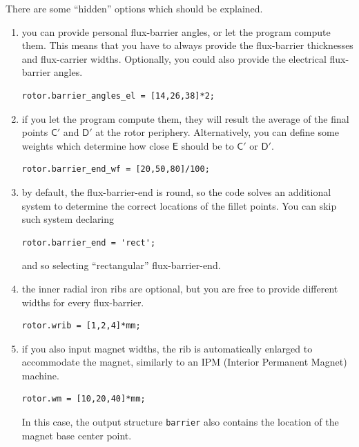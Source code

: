 \documentclass[b5paper,11pt,oneside,fleqn]{article}
\newcommand{\pt}[1]{\mathsf{#1}}
\begin{document}
There are some ``hidden'' options which should be explained.
\begin{enumerate}
\item you can provide personal flux-barrier angles, or let the program compute 
them.
This means that you have to always provide the flux-barrier thicknesses and 
flux-carrier widths.
Optionally, you could also provide the electrical flux-barrier angles.
\begin{lstlisting}[style=Matlab]
rotor.barrier_angles_el = [14,26,38]*2;
\end{lstlisting}

\item if you let the program compute them, they will result the average of the 
final points $ \pt{C}' $ and $ \pt{D}' $ at the rotor periphery. Alternatively, 
you can define some weights which determine how close $ \pt{E} $ should be to 
$ \pt{C}' $ or $ \pt{D}' $.
\begin{lstlisting}[style=Matlab]
rotor.barrier_end_wf = [20,50,80]/100;
\end{lstlisting}

\item by default, the flux-barrier-end is round, so the code solves an 
additional system to determine the correct locations of the fillet points.
You can skip such system declaring 
\begin{lstlisting}[style=Matlab]
rotor.barrier_end = 'rect';
\end{lstlisting}
and so selecting ``rectangular'' flux-barrier-end.

\item the inner radial iron ribs are optional, but you are free to provide 
different widths for every flux-barrier.
\begin{lstlisting}[style=Matlab]
rotor.wrib = [1,2,4]*mm;
\end{lstlisting}

\item if you also input magnet widths, the rib is automatically enlarged to 
accommodate the magnet, similarly to an IPM (Interior Permanent Magnet) machine.
\begin{lstlisting}[style=Matlab]
rotor.wm = [10,20,40]*mm;
\end{lstlisting}
In this case, the output structure \texttt{barrier} also contains the location 
of the magnet base center point.

\end{enumerate}
\end{document}
